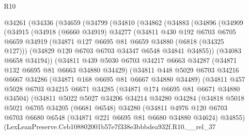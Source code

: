 \begin{lexlean}{R10}
\begin{coremodule}
  @34261
    (@34336
      (@34659
        (@34799
          (@34810
            (@34862
              (@34883
                (@34896
                  (@34909
                    (@34915
                      (@34918
                        (@6660 @34919)
                        @34277
                        (@34811
                          @430
                          @192
                          @6703
                          @6705
                          @6659
                          @34919
                          (@34871 @127 @6695 @81 @6659 @34880 (@6818 (@34325 @127)))
                          (@34829 @120 @6703 @6703 @34347 @6548 @34841 @34855))
                        (@34083 @6658 @34194))
                      (@34811
                        @439
                        @5030
                        @6703
                        @34217
                        @6663
                        @34287
                        (@34871 @132 @6695 @81 @6663 @34880 @34429)
                        (@34811
                          @448
                          @5029
                          @6703
                          @34216
                          @6667
                          @34286
                          (@34871 @168 @6695 @81 @6667 @34880 @34489)
                          (@34811
                            @457
                            @5028
                            @6703
                            @34215
                            @6671
                            @34285
                            (@34871 @174 @6695 @81 @6671 @34880 @34504)
                            (@34811
                              @5022
                              @5027
                              @34206
                              @34214
                              @34280
                              @34284
                              (@34818
                                @5018
                                @5021
                                @6705
                                @34205
                                (@6681 @6548)
                                @34280
                                (@34811
                                  @4976
                                  @120
                                  @6703
                                  @6703
                                  @6680
                                  @6548
                                  (@34871 @221 @6695 @81 @6680 @34880 @34624)
                                  @34855)
                                (LexLeanPreserve.Ceb108802001b57e7f338e3bbbdea932f.R10.__rel_37

\end{coremodule}
\end{lexlean}
